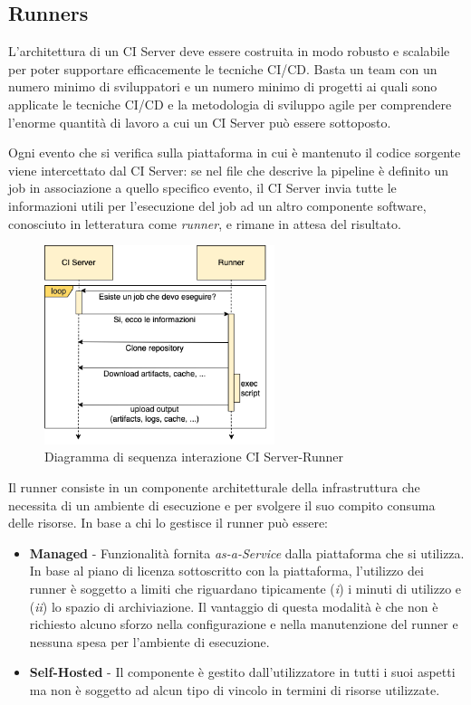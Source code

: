 \subsection{Runners}
L'architettura di un CI Server deve essere costruita in modo robusto e scalabile per poter supportare efficacemente le tecniche CI/CD. Basta un team con un numero minimo di sviluppatori e un numero minimo di progetti ai quali sono applicate le tecniche CI/CD e la metodologia di sviluppo agile per comprendere l'enorme quantità di lavoro a cui un CI Server può essere sottoposto.

Ogni evento che si verifica sulla piattaforma in cui è mantenuto il codice sorgente viene intercettato dal CI Server: se nel file che descrive la pipeline è definito un job in associazione a quello specifico evento, il CI Server invia tutte le informazioni utili per l'esecuzione del job ad un altro componente software, conosciuto in letteratura come \textit{runner}, e rimane in attesa del risultato.

\begin{figure}[H]
    \centering
    \includegraphics[width=0.6\textwidth]{img/ciserver-runner.png}
    \caption{Diagramma di sequenza interazione CI Server-Runner}
    \label{ci-server-runner}
\end{figure}

Il runner consiste in un componente architetturale della infrastruttura che necessita di un ambiente di esecuzione e per svolgere il suo compito consuma delle risorse. In base a chi lo gestisce il runner può essere:

\begin{itemize}
    \item \textbf{Managed} - Funzionalità fornita \textit{as-a-Service} dalla piattaforma che si utilizza. In base al piano di licenza sottoscritto con la piattaforma, l'utilizzo dei runner è soggetto a limiti che riguardano tipicamente (\textit{i}) i minuti di utilizzo e (\textit{ii}) lo spazio di archiviazione. Il vantaggio di questa modalità è che non è richiesto alcuno sforzo nella configurazione e nella manutenzione del runner e nessuna spesa per l'ambiente di esecuzione.
    \item \textbf{Self-Hosted} - Il componente è gestito dall'utilizzatore in tutti i suoi aspetti ma non è soggetto ad alcun tipo di vincolo in termini di risorse utilizzate.
\end{itemize}